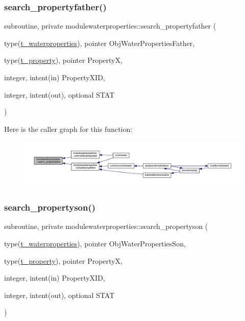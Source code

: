 \subsubsection{\texorpdfstring{search\+\_\+propertyfather()}{search\_propertyfather()}}
{\footnotesize\ttfamily subroutine, private modulewaterproperties\+::search\+\_\+propertyfather (\begin{DoxyParamCaption}\item[{type(\mbox{\hyperlink{structmodulewaterproperties_1_1t__waterproperties}{t\+\_\+waterproperties}}), pointer}]{Obj\+Water\+Properties\+Father,  }\item[{type(\mbox{\hyperlink{structmodulewaterproperties_1_1t__property}{t\+\_\+property}}), pointer}]{PropertyX,  }\item[{integer, intent(in)}]{Property\+X\+ID,  }\item[{integer, intent(out), optional}]{S\+T\+AT }\end{DoxyParamCaption})\hspace{0.3cm}{\ttfamily [private]}}

Here is the caller graph for this function\+:\nopagebreak
\begin{figure}[H]
\begin{center}
\leavevmode
\includegraphics[width=350pt]{namespacemodulewaterproperties_a1dec5db35cff13d783df415f7991aff7_icgraph}
\end{center}
\end{figure}
\mbox{\label{namespacemodulewaterproperties_afdb62b42fe2bd1edafce470c06060ee4}} 
\subsubsection{\texorpdfstring{search\+\_\+propertyson()}{search\_propertyson()}}
{\footnotesize\ttfamily subroutine, private modulewaterproperties\+::search\+\_\+propertyson (\begin{DoxyParamCaption}\item[{type(\mbox{\hyperlink{structmodulewaterproperties_1_1t__waterproperties}{t\+\_\+waterproperties}}), pointer}]{Obj\+Water\+Properties\+Son,  }\item[{type(\mbox{\hyperlink{structmodulewaterproperties_1_1t__property}{t\+\_\+property}}), pointer}]{PropertyX,  }\item[{integer, intent(in)}]{Property\+X\+ID,  }\item[{integer, intent(out), optional}]{S\+T\+AT }\end{DoxyParamCaption})\hspace{0.3cm}{\ttfamily [private]}}


